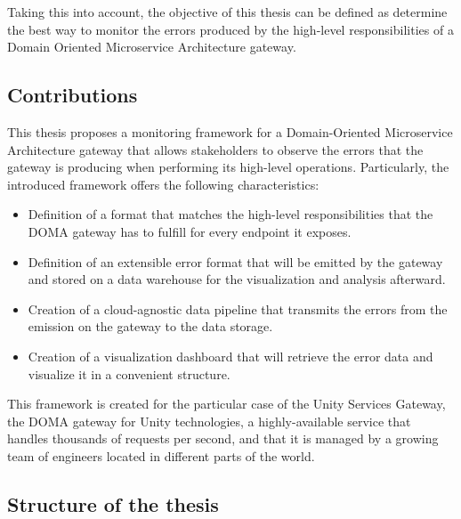 \documentclass[english, 12pt, a4paper, sci, utf8, a-1b, online]{aaltothesis}
\begin{document}
Taking this into account, the objective of this thesis can be defined as determine the best way to monitor the errors produced by the high-level responsibilities of a Domain Oriented Microservice Architecture gateway.

\subsection{Contributions}


This thesis proposes a monitoring framework for a Domain-Oriented Microservice Architecture gateway that allows stakeholders to observe the errors that the gateway is producing when performing its high-level operations. Particularly, the introduced framework offers the following characteristics:

\begin{itemize}
    \item Definition of a format that matches the high-level responsibilities that the DOMA gateway has to fulfill for every endpoint it exposes.
    \item Definition of an extensible error format that will be emitted by the gateway and stored on a data warehouse for the visualization and analysis afterward.
    \item Creation of a cloud-agnostic data pipeline that transmits the errors from the emission on the gateway to the data storage.
    \item Creation of a visualization dashboard that will retrieve the error data and visualize it in a convenient structure.
\end{itemize}

This framework is created for the particular case of the Unity Services Gateway, the DOMA gateway for Unity technologies, a highly-available service that handles thousands of requests per second, and that it is managed by a growing team of engineers located in different parts of the world.

\subsection{Structure of the thesis}
\end{document}
